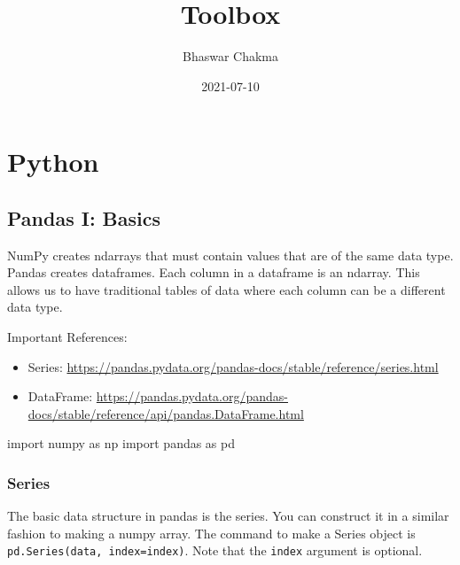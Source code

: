 \documentclass[
]{book}
\title{Toolbox}
\author{Bhaswar Chakma}
\date{2021-07-10}
\newenvironment{Shaded}{\begin{snugshade}}{\end{snugshade}}
\newcommand{\ImportTok}[1]{#1}
\newcommand{\NormalTok}[1]{#1}
\begin{document}
\maketitle

{
\setcounter{tocdepth}{1}
\tableofcontents
}
\hypertarget{section}{%
\chapter*{}\label{section}}

\hypertarget{python}{%
\chapter{Python}\label{python}}

\hypertarget{pandas-i-basics}{%
\section{Pandas I: Basics}\label{pandas-i-basics}}

NumPy creates ndarrays that must contain values that are of the same data type.
Pandas creates dataframes. Each column in a dataframe is an ndarray. This allows us to have
traditional tables of data where each column can be a different data type.

Important References:

\begin{itemize}
\item
  Series: \url{https://pandas.pydata.org/pandas-docs/stable/reference/series.html}
\item
  DataFrame: \url{https://pandas.pydata.org/pandas-docs/stable/reference/api/pandas.DataFrame.html}
\end{itemize}

\begin{Shaded}
\begin{Highlighting}[]
\ImportTok{import}\NormalTok{ numpy }\ImportTok{as}\NormalTok{ np}
\ImportTok{import}\NormalTok{ pandas }\ImportTok{as}\NormalTok{ pd}
\end{Highlighting}
\end{Shaded}

\hypertarget{series}{%
\subsection{Series}\label{series}}

The basic data structure in pandas is the series. You can construct it in a similar fashion to making a numpy array. The command to make a Series object is
\texttt{pd.Series(data,\ index=index)}. Note that the \texttt{index} argument is optional.
\end{document}
